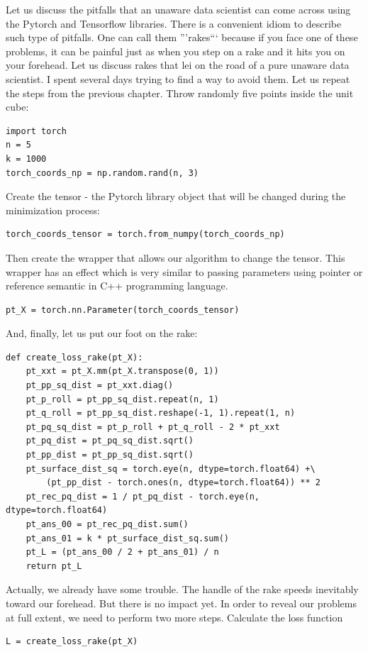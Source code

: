 \documentclass[12pt]{extarticle}
\begin{document}
Let us discuss the pitfalls that an unaware data scientist can come across using the
Pytorch and Tensorflow libraries.
%
There is a convenient idiom to describe such type of pitfalls.
%
One can call them '''rakes``` because if you face 
one of these problems, it can be painful just as when you step on a rake 
and it hits you on your forehead.
%
Let us discuss rakes that lei on the road of a pure unaware
data scientist.
%
I spent several days trying to find a way to avoid them.
%
Let us repeat the steps from the previous chapter.
%
Throw randomly five points inside the unit cube:
\begin{lstlisting}[frame=single]
import torch
n = 5
k = 1000
torch_coords_np = np.random.rand(n, 3)
\end{lstlisting}
%
Create the tensor - the Pytorch library object that will be changed
during the minimization process:
\begin{lstlisting}[frame=single]
torch_coords_tensor = torch.from_numpy(torch_coords_np)
\end{lstlisting}
%
Then create the wrapper that allows our algorithm to change
the tensor.
%
This wrapper has an effect which is very similar to passing parameters
using pointer or reference semantic in C++ programming language.
%
\begin{lstlisting}[frame=single]
 pt_X = torch.nn.Parameter(torch_coords_tensor)
\end{lstlisting}
%
And, finally, let us put our foot on the rake:
%
\begin{lstlisting}[frame=single]
def create_loss_rake(pt_X):
    pt_xxt = pt_X.mm(pt_X.transpose(0, 1))
    pt_pp_sq_dist = pt_xxt.diag()
    pt_p_roll = pt_pp_sq_dist.repeat(n, 1)
    pt_q_roll = pt_pp_sq_dist.reshape(-1, 1).repeat(1, n)
    pt_pq_sq_dist = pt_p_roll + pt_q_roll - 2 * pt_xxt 
    pt_pq_dist = pt_pq_sq_dist.sqrt()
    pt_pp_dist = pt_pp_sq_dist.sqrt()
    pt_surface_dist_sq = torch.eye(n, dtype=torch.float64) +\
        (pt_pp_dist - torch.ones(n, dtype=torch.float64)) ** 2
    pt_rec_pq_dist = 1 / pt_pq_dist - torch.eye(n, dtype=torch.float64)
    pt_ans_00 = pt_rec_pq_dist.sum()
    pt_ans_01 = k * pt_surface_dist_sq.sum()
    pt_L = (pt_ans_00 / 2 + pt_ans_01) / n
    return pt_L
\end{lstlisting}
%
Actually, we already have some trouble.
%
The handle of the rake speeds inevitably toward our forehead.
%
But there is no impact yet.
%
In order to reveal our problems at full extent, we need to
perform two more steps.
%
Calculate the loss function
\begin{lstlisting}[frame=single]
L = create_loss_rake(pt_X)
\end{lstlisting}
\end{document}

